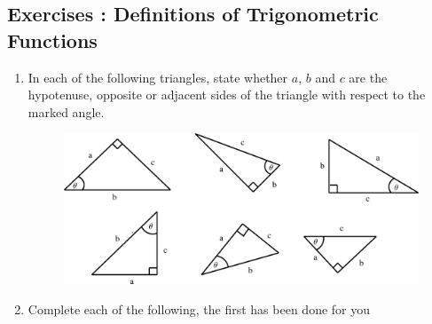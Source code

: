             \subsection{  Exercises : Definitions of Trigonometric Functions }
            \nopagebreak
      \label{m39408*id80155}\begin{enumerate}[noitemsep, label=\textbf{\arabic*}. ] 
            \label{m39408*uid22}\item In each of the following triangles, state whether \begin{math}a\end{math}, \begin{math}b\end{math} and \begin{math}c\end{math} are the hypotenuse, opposite or adjacent sides of the triangle with respect to the marked angle.
    \setcounter{subfigure}{0}
	\begin{figure}[H] %
    \begin{center}
    \label{m39408*id80200!!!underscore!!!media}\label{m39408*id80200!!!underscore!!!printimage}\includegraphics{col11306.imgs/m39408_MG10C15_004.png} %
      \vspace{2pt}
    \vspace{.1in}
    \end{center}
 \end{figure}       \label{m39408*uid23}\item Complete each of the following, the first has been done for you
    \setcounter{subfigure}{0}
	\begin{figure}[H] %
    \begin{center}

\end{center}
\end{figure}
\end{enumerate}
